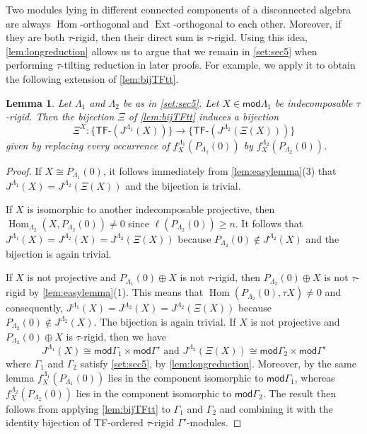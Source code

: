 \documentclass[11pt]{amsart}
\newcommand{\mods}{\mathsf{mod}}
\DeclareMathOperator{\Hom}{\mathrm{Hom}}
\DeclareMathOperator{\Ext}{\mathrm{Ext}}
\newcommand{\tfo}[1]{\ensuremath{\mathsf{TF}\text{-} #1}}
\newtheorem{lemma}[theorem]{Lemma}
\theoremstyle{definition}
\begin{document}
Two modules lying in different connected components of a disconnected algebra are always $\Hom$-orthogonal and $\Ext$-orthogonal to each other. Moreover, if they are both $\tau$-rigid, then their direct sum is $\tau$-rigid. Using this idea, \cref{lem:longreduction} allows us to argue that we remain in \cref{set:sec5} when performing $\tau$-tilting reduction in later proofs. For example, we apply it to obtain the following extension of \cref{lem:bijTFtt}.


\begin{lemma}\label{lem:reducedbijection}
    Let $\Lambda_1$ and $\Lambda_2$ be as in \cref{set:sec5}. Let $X \in \mods \Lambda_1$ be indecomposable $\tau$-rigid. Then the bijection $\Xi$ of \cref{lem:bijTFtt} induces a bijection
    \[ \Xi^{X}: \{ \tfo{(J^{\Lambda_1}(X))}\} \to \{ \tfo{(J^{\Lambda_2}(\Xi(X)))}\}\]
    given by replacing every occurrence of $f_X^{\Lambda_1} (P_{\Lambda_1}(0))$ by $f_{X}^{\Lambda_2}(P_{\Lambda_2}(0))$.
\end{lemma}
\begin{proof}
    If $X \cong P_{\Lambda_1}(0)$, it follows immediately from \cref{lem:easylemma}(3) that $J^{\Lambda_1}(X) = J^{\Lambda_2}(\Xi(X))$ and the bijection is trivial. 

    If $X$ is isomorphic to another indecomposable projective, then $\Hom_{\Lambda_2}(X,P_{\Lambda_2}(0)) \neq 0$ since $\ell(P_{\Lambda_2}(0)) \geq n$. It follows that $J^{\Lambda_1}(X) = J^{\Lambda_2}(X) = J^{\Lambda_2}(\Xi(X))$ because $P_{\Lambda_2}(0) \not \in J^{\Lambda_2}(X)$ and the bijection is again trivial. 
    
    If $X$ is not projective and $P_{\Lambda_1}(0) \oplus X$ is not $\tau$-rigid, then $P_{\Lambda_2}(0) \oplus X$ is not $\tau$-rigid by \cref{lem:easylemma}(1). This means that $\Hom(P_{\Lambda_2}(0), \tau X) \neq 0$ and consequently, $J^{\Lambda_1}(X) = J^{\Lambda_2}(X) = J^{\Lambda_2}(\Xi(X))$ because $P_{\Lambda_2}(0) \not \in J^{\Lambda_2}(X)$. The bijection is again trivial. If $X$ is not projective and $P_{\Lambda_2}(0) \oplus X$ is $\tau$-rigid, then we have 
    \begin{equation}\label{eq:jassosplit} J^{\Lambda_1}(X) \cong \mods \Gamma_1 \times \mods \Gamma' \text{ and } J^{\Lambda_2}(\Xi(X)) \cong \mods \Gamma_2 \times \mods \Gamma' \end{equation}
    where $\Gamma_1$ and $\Gamma_2$ satisfy \cref{set:sec5}, by \cref{lem:longreduction}. Moreover, by the same lemma $f_X^{\Lambda_1}(P_{\Lambda_1}(0))$ lies in the component isomorphic to $\mods \Gamma_1$, whereas $f_X^{\Lambda_2}(P_{\Lambda_2}(0))$ lies in the component isomorphic to $\mods \Gamma_2$. The result then follows from applying \cref{lem:bijTFtt} to $\Gamma_1$ and $\Gamma_2$ and combining it with the identity bijection of TF-ordered $\tau$-rigid $\Gamma'$-modules.
\end{proof}
\end{document}
